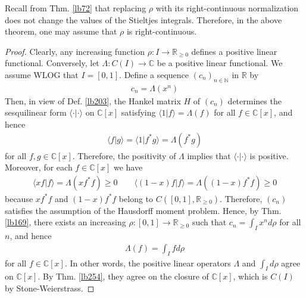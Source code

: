 \documentclass[12pt,b5paper,notitlepage]{article}
\theoremstyle{definition}
\theoremstyle{plain}
\newcommand{\bk}[1]{\langle {#1}\rangle}
\newcommand{\Cbb}{\mathbb C}
\newcommand{\Nbb}{\mathbb N}
\newcommand{\Rbb}{\mathbb R}
\numberwithin{equation}{section}
\begin{document}
Recall from Thm. \ref{lb72} that replacing $\rho$ with its right-continuous normalization does not change the values of the Stieltjes integrals. Therefore, in the above theorem, one may assume that $\rho$ is right-continuous.

\begin{proof}
Clearly, any increasing function $\rho:I\rightarrow\Rbb_{\geq0}$ defines a positive linear functional. Conversely, let $\Lambda:C(I)\rightarrow\Cbb$ be a positive linear functional. We assume WLOG that $I=[0,1]$. Define a sequence $(c_n)_{n\in\Nbb}$ in $\Rbb$ by
\begin{align*}
c_n=\Lambda(x^n)
\end{align*}
Then, in view of Def. \ref{lb203}, the Hankel matrix $H$ of $(c_n)$ determines the sesquilinear form $\bk{\cdot|\cdot}$ on $\Cbb[x]$ satisfying $\bk{1|f}=\Lambda(f)$ for all $f\in\Cbb[x]$, and hence
\begin{align*}
\bk{f|g}=\bk{1|f^*g}=\Lambda(f^*g)
\end{align*}
for all $f,g\in\Cbb[x]$. Therefore, the positivity of $\Lambda$ implies that $\bk{\cdot|\cdot}$ is positive. Moreover, for each $f\in\Cbb[x]$ we have
\begin{align*}
\bk{xf|f}=\Lambda(xf^*f)\geq0\qquad \bk{(1-x)f|f}=\Lambda((1-x)f^*f)\geq0
\end{align*}
because $xf^*f$ and $(1-x)f^*f$ belong to $C([0,1],\Rbb_{\geq0})$. Therefore, $(c_n)$ satisfies the assumption of the Hausdorff moment problem. Hence, by Thm. \ref{lb169}, there exists an increasing $\rho:[0,1]\rightarrow\Rbb_{\geq0}$ such that $c_n=\int_Ix^nd\rho$ for all $n$, and hence
\begin{align*}
\Lambda(f)=\int_Ifd\rho
\end{align*}
for all $f\in\Cbb[x]$. In other words, the positive linear operators $\Lambda$ and $\int_Id\rho$ agree on $\Cbb[x]$. By Thm. \ref{lb254}, they agree on the closure of $\Cbb[x]$, which is $C(I)$ by Stone-Weierstrass.
\end{proof}
\end{document}
